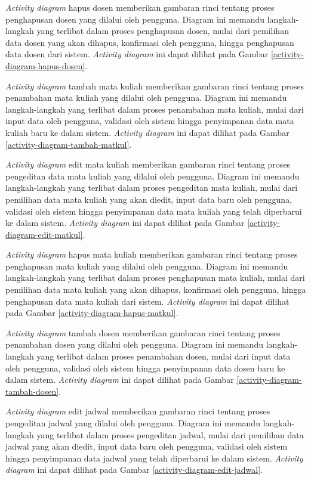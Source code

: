 \textit{Activity diagram} hapus dosen memberikan gambaran rinci tentang proses penghapusan dosen yang dilalui oleh pengguna. Diagram ini memandu langkah-langkah yang terlibat dalam proses penghapusan dosen, mulai dari pemilihan data dosen yang akan dihapus, konfirmasi oleh pengguna, hingga penghapusan data dosen dari sistem. \textit{Activity diagram} ini dapat dilihat pada Gambar \ref{activity-diagram-hapus-dosen}.


\textit{Activity diagram} tambah mata kuliah memberikan gambaran rinci tentang proses penambahan mata kuliah yang dilalui oleh pengguna. Diagram ini memandu langkah-langkah yang terlibat dalam proses penambahan mata kuliah, mulai dari input data oleh pengguna, validasi oleh sistem hingga penyimpanan data mata kuliah baru ke dalam sistem. \textit{Activity diagram} ini dapat dilihat pada Gambar \ref{activity-diagram-tambah-matkul}.


\textit{Activity diagram} edit mata kuliah memberikan gambaran rinci tentang proses pengeditan data mata kuliah yang dilalui oleh pengguna. Diagram ini memandu langkah-langkah yang terlibat dalam proses pengeditan mata kuliah, mulai dari pemilihan data mata kuliah yang akan diedit, input data baru oleh pengguna, validasi oleh sistem hingga penyimpanan data mata kuliah yang telah diperbarui ke dalam sistem. \textit{Activity diagram} ini dapat dilihat pada Gambar \ref{activity-diagram-edit-matkul}.


\textit{Activity diagram} hapus mata kuliah memberikan gambaran rinci tentang proses penghapusan mata kuliah yang dilalui oleh pengguna. Diagram ini memandu langkah-langkah yang terlibat dalam proses penghapusan mata kuliah, mulai dari pemilihan data mata kuliah yang akan dihapus, konfirmasi oleh pengguna, hingga penghapusan data mata kuliah dari sistem. \textit{Activity diagram} ini dapat dilihat pada Gambar \ref{activity-diagram-hapus-matkul}.


\textit{Activity diagram} tambah dosen memberikan gambaran rinci tentang proses penambahan dosen yang dilalui oleh pengguna. Diagram ini memandu langkah-langkah yang terlibat dalam proses penambahan dosen, mulai dari input data oleh pengguna, validasi oleh sistem hingga penyimpanan data dosen baru ke dalam sistem. \textit{Activity diagram} ini dapat dilihat pada Gambar \ref{activity-diagram-tambah-dosen}.


\textit{Activity diagram} edit jadwal memberikan gambaran rinci tentang proses pengeditan jadwal yang dilalui oleh pengguna. Diagram ini memandu langkah-langkah yang terlibat dalam proses pengeditan jadwal, mulai dari pemilihan data jadwal yang akan diedit, input data baru oleh pengguna, validasi oleh sistem hingga penyimpanan data jadwal yang telah diperbarui ke dalam sistem. \textit{Activity diagram} ini dapat dilihat pada Gambar \ref{activity-diagram-edit-jadwal}.


